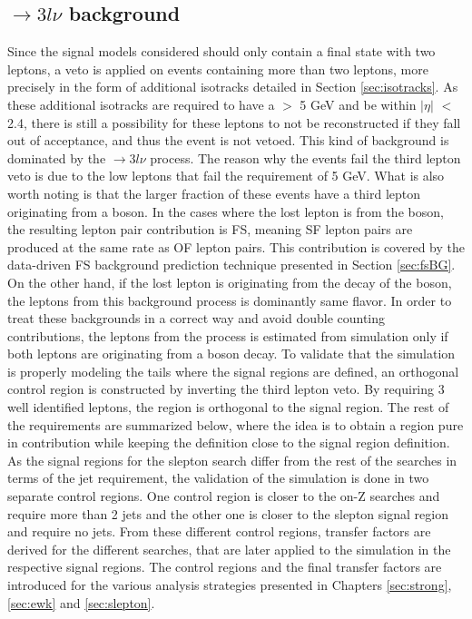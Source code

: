 \subsection*{\PWZ$\rightarrow3l\nu$ background}
\noindent\justify
Since the signal models considered should only contain a final state with two leptons, a veto is applied on events containing more than two leptons, more precisely in the form of additional isotracks
 detailed in Section \ref{sec:isotracks}. 
As these additional isotracks are required to have a \pt $>$ 5 GeV and be within $|\eta|$ $<$ 2.4, there is still a possibility for these leptons to not be reconstructed if they fall out of acceptance, and thus the event is not vetoed. 
This kind of background is dominated by the \PWZ$\rightarrow3l\nu$ process.
The reason why the events fail the third lepton veto is due to the low \pt leptons that fail the \pt requirement of 5 GeV. 
What is also worth noting is that the larger fraction of these events have a third lepton originating from a \PZ boson. 
In the cases where the lost lepton is from the \PZ boson, the resulting lepton pair contribution is FS, meaning SF lepton pairs are produced at the same rate as OF lepton pairs. 
This contribution is covered by the data-driven FS background prediction technique presented in Section \ref{sec:fsBG}.
On the other hand, if the lost lepton is originating from the decay of the \PW boson, the leptons from this background process is dominantly same flavor. 
In order to treat these backgrounds in a correct way and avoid double counting contributions, the leptons from the \PWZ process is estimated from simulation only if both leptons are originating from a \PZ boson decay. 
\newpara
\noindent\justify
To validate that the simulation is properly modeling the \ptmiss tails where the signal regions are defined, an orthogonal control region is constructed by inverting the third lepton veto. 
By requiring 3 well identified leptons, the region is orthogonal to the signal region. 
The rest of the requirements are summarized below, where the idea is to obtain a region pure in \PWZ contribution while keeping the definition close to the signal region definition. 
As the signal regions for the slepton search differ from the rest of the searches in terms of the jet requirement, the validation of the \PWZ simulation is done in two separate control regions. 
One control region is closer to the on-Z searches and require more than 2 jets and the other one is closer to the slepton signal region and require no jets. 
From these different control regions, transfer factors are derived for the different searches, that are later applied to the simulation in the respective signal regions. 
The control regions and the final transfer factors are introduced for the various analysis strategies presented in Chapters \ref{sec:strong}, \ref{sec:ewk} and \ref{sec:slepton}. 
